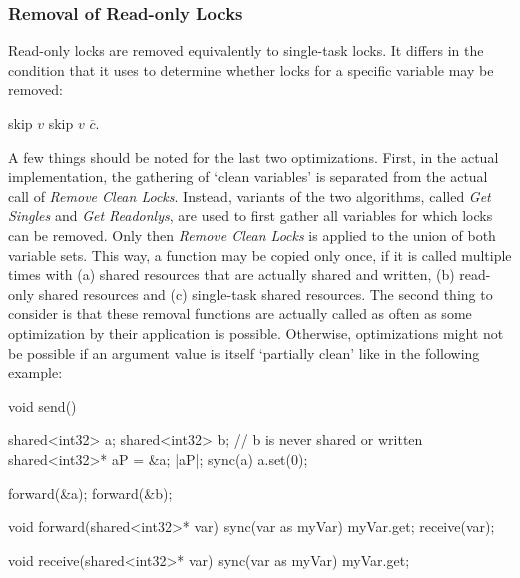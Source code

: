 \subsubsection{Removal of Read-only Locks}
Read-only locks are removed equivalently to single-task locks. It differs in the condition that it uses to determine whether locks for a specific variable may be removed: 
\begin{algorithmic}
 
    \State skip $v$
    \State skip $v$
  \EndIf
  \State $\overline{c}$. 
\EndFor
\State {}
\EndFunction
\end{algorithmic}
A few things should be noted for the last two optimizations. First, in the actual implementation, the gathering of `clean variables' is separated from the actual call of \textit{Remove Clean Locks}. Instead, variants of the two algorithms, called \textit{Get Singles} and \textit{Get Readonlys}, are used to first gather all variables for which locks can be removed. Only then \textit{Remove Clean Locks} is applied to the union of both variable sets. This way, a function may be copied only once, if it is called multiple times with (a) shared resources that are actually shared and written, (b) read-only shared resources and (c) single-task shared resources. The second thing to consider is that these removal functions are actually called as often as some optimization by their application is possible. Otherwise, optimizations might not be possible if an argument value is itself `partially clean' like  in the following example:
\begin{ccode}
void send() {
  shared<int32> a;
  shared<int32> b;          // b is never shared or written
  shared<int32>* aP = &a;
  |aP|;
  sync(a) { a.set(0); }
  
  forward(&a);
  forward(&b);
}

void forward(shared<int32>* var) {
  sync(var as myVar) { myVar.get; }
  receive(var);
}

void receive(shared<int32>* var) {
  sync(var as myVar) { myVar.get; }
}
\end{ccode} 
